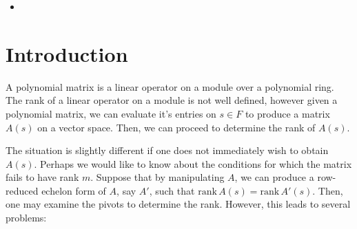 \documentclass{amsart}
\theoremstyle{definition}
\theoremstyle{remark}
\numberwithin{equation}{section}
\begin{document}
\begin{itemize}
\item {}
\end{itemize}


\newpage

\setcounter{page}{1}

\section{Introduction}

A polynomial matrix is a linear operator on a module over a polynomial ring. The rank of a linear operator on a module is not well defined, however given a polynomial matrix, we can evaluate it's entries on $s \in F$ to produce a matrix $A(s)$ on a vector space. Then, we can proceed to determine the rank of $A(s)$.

The situation is slightly different if one does not immediately wish to obtain $A(s)$. Perhaps we would like to know about the conditions for which the matrix fails to have rank $m$. Suppose that by manipulating $A$, we can produce a row-reduced echelon form of $A$, say $A'$, such that $\mathrm{rank}\,A(s) = \mathrm{rank}\,A'(s)$. Then, one may examine the pivots to determine the rank. However, this leads to several problems:
\end{document}
